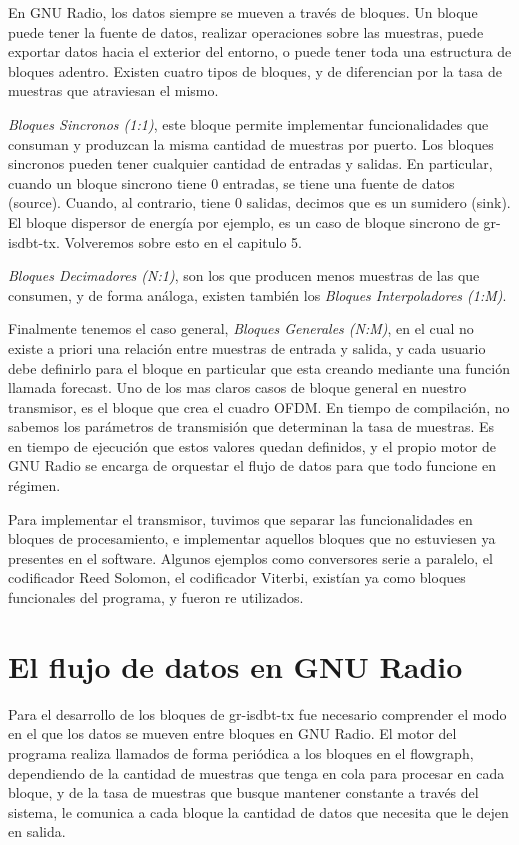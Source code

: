 En GNU Radio, los datos siempre se mueven a través de bloques. Un bloque puede tener la fuente de datos, realizar operaciones sobre las muestras, puede exportar datos hacia el exterior del entorno, o puede tener toda una estructura de bloques adentro. 
Existen cuatro tipos de bloques, y de diferencian por la tasa de muestras que atraviesan el mismo. 

\textit{Bloques Sincronos (1:1)}, este bloque permite implementar funcionalidades que consuman y produzcan la misma cantidad de muestras por puerto. Los bloques sincronos pueden tener cualquier cantidad de entradas y salidas. En particular, cuando un bloque sincrono tiene 0 entradas, se tiene una fuente de datos (source). Cuando, al contrario, tiene 0 salidas, decimos que es un sumidero (sink). El bloque dispersor de energía por ejemplo, es un caso de bloque sincrono de gr-isdbt-tx. Volveremos sobre esto en el capitulo 5.

\textit{Bloques Decimadores (N:1)}, son los que producen menos muestras de las que consumen, y de forma análoga, existen también los \textit{Bloques Interpoladores (1:M)}.

Finalmente tenemos el caso general, \textit{Bloques Generales (N:M)}, en el cual no existe a priori una relación entre muestras de entrada y salida, y cada usuario debe definirlo para el bloque en particular que esta creando mediante una función llamada forecast. Uno de los mas claros casos de bloque general en nuestro transmisor, es el bloque que crea el cuadro OFDM. En tiempo de compilación, no sabemos los parámetros de transmisión que determinan la tasa de muestras. Es en tiempo de ejecución que estos valores quedan definidos, y el propio motor de GNU Radio se encarga de orquestar el flujo de datos para que todo funcione en régimen.

Para implementar el transmisor, tuvimos que separar las funcionalidades en bloques de procesamiento, e implementar aquellos bloques que no estuviesen ya presentes en el software. Algunos ejemplos como conversores serie a paralelo, el codificador Reed Solomon, el codificador Viterbi, existían ya como bloques funcionales del programa, y fueron re utilizados. 

\section{El flujo de datos en GNU Radio}

Para el desarrollo de los bloques de gr-isdbt-tx fue necesario comprender el modo en el que los datos se mueven entre bloques en GNU Radio. El motor del programa realiza llamados de forma periódica a los bloques en el flowgraph, dependiendo de la cantidad de muestras que tenga en cola para procesar en cada bloque, y de la tasa de muestras que busque mantener constante a través del sistema, le comunica a cada bloque la cantidad de datos que necesita que le dejen en salida.  

